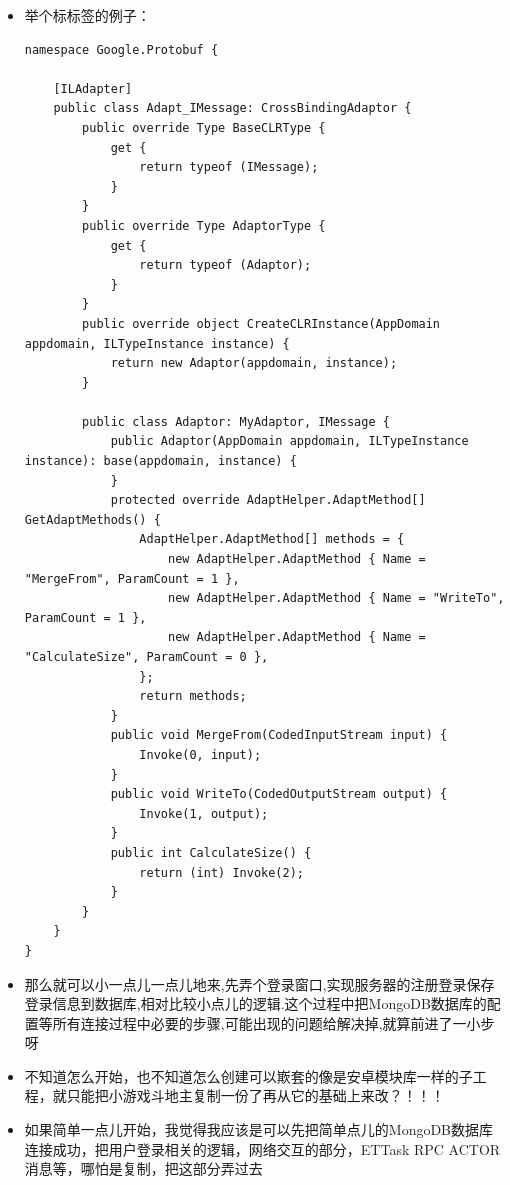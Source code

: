 \documentclass[9pt, b5paper]{article}
\begin{document}
\begin{itemize}
\item 举个标标签的例子：
\begin{verbatim}
namespace Google.Protobuf {

    [ILAdapter]
    public class Adapt_IMessage: CrossBindingAdaptor {
        public override Type BaseCLRType {
            get {
                return typeof (IMessage);
            }
        }
        public override Type AdaptorType {
            get {
                return typeof (Adaptor);
            }
        }
        public override object CreateCLRInstance(AppDomain appdomain, ILTypeInstance instance) {
            return new Adaptor(appdomain, instance);
        }

        public class Adaptor: MyAdaptor, IMessage {
            public Adaptor(AppDomain appdomain, ILTypeInstance instance): base(appdomain, instance) {
            }
            protected override AdaptHelper.AdaptMethod[] GetAdaptMethods() {
                AdaptHelper.AdaptMethod[] methods = {
                    new AdaptHelper.AdaptMethod { Name = "MergeFrom", ParamCount = 1 },
                    new AdaptHelper.AdaptMethod { Name = "WriteTo", ParamCount = 1 },
                    new AdaptHelper.AdaptMethod { Name = "CalculateSize", ParamCount = 0 },
                };
                return methods;
            }
            public void MergeFrom(CodedInputStream input) {
                Invoke(0, input);
            }
            public void WriteTo(CodedOutputStream output) {
                Invoke(1, output);
            }
            public int CalculateSize() {
                return (int) Invoke(2);
            }
        }
    }
}
\end{verbatim}
\item 那么就可以小一点儿一点儿地来,先弄个登录窗口,实现服务器的注册登录保存登录信息到数据库,相对比较小点儿的逻辑.这个过程中把MongoDB数据库的配置等所有连接过程中必要的步骤,可能出现的问题给解决掉,就算前进了一小步呀
\item 不知道怎么开始，也不知道怎么创建可以㠌套的像是安卓模块库一样的子工程，就只能把小游戏斗地主复制一份了再从它的基础上来改？！！！
\item 如果简单一点儿开始，我觉得我应该是可以先把简单点儿的MongoDB数据库连接成功，把用户登录相关的逻辑，网络交互的部分，ETTask RPC ACTOR消息等，哪怕是复制，把这部分弄过去
\end{itemize}
\end{document}
